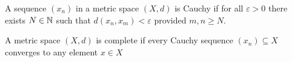 \begin{definition}
    A sequence $(x_n)$ in a metric space $(X, d)$ is Cauchy if for all $\varepsilon > 0$ there exists $N \in \mathbb{N}$ such that $d(x_n, x_m) < \varepsilon$ provided $m, n \geq N$.
\end{definition}

\begin{definition}
    A metric space $(X, d)$ is complete if every Cauchy sequence $(x_n) \subseteq X$ converges to any element $x \in X$
\end{definition}

